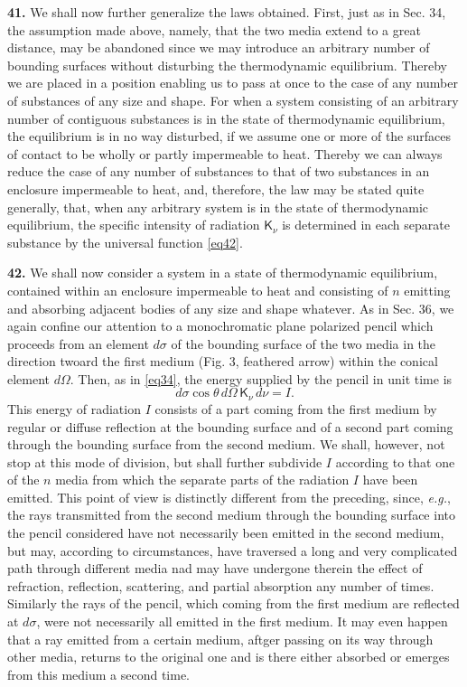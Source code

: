 \documentclass[12pt,oneside]{book}
\begin{document}
\textbf{41.} We shall now further generalize the laws obtained. First, just as in Sec. 34, the assumption made above, namely, that the two media extend to a great distance, may be abandoned since we may introduce an arbitrary number of bounding surfaces without disturbing the thermodynamic equilibrium. Thereby we are placed in a position enabling us to pass at once to the case of any number of substances of any size and shape. For when a system consisting of an arbitrary number of contiguous substances is in the state of thermodynamic equilibrium, the equilibrium is in no way disturbed, if we assume one or more of the surfaces of contact to be wholly or partly impermeable to heat. Thereby we can always reduce the case of any number of substances to that of two substances in an enclosure impermeable to heat, and, therefore, the law may be stated quite generally, that, when any arbitrary system is in the state of thermodynamic equilibrium, the specific intensity of radiation $\mathsf{K}_\nu$ is determined in each separate substance by the universal function \eqref{eq42}. \par

\textbf{42.} We shall now consider a system in a state of thermodynamic equilibrium, contained within an enclosure impermeable to heat and consisting of $n$ emitting and absorbing adjacent bodies of any size and shape whatever. As in Sec. 36, we again confine our attention to a monochromatic plane polarized pencil which proceeds from an element $d\sigma$ of the bounding surface of the two media in the direction twoard the first medium (Fig. 3, feathered arrow) within the conical element $d\Omega$. Then, as in \eqref{eq34}, the energy supplied by the pencil in unit time is
\begin{equation}
    d\sigma\cos\theta\,d\Omega\,\mathsf{K}_\nu\,d\nu=I.
    \label{eq43}
\end{equation}
This energy of radiation $I$ consists of a part coming from the first medium by regular or diffuse reflection at the bounding surface and of a second part coming through the bounding surface from the second medium. We shall, however, not stop at this mode of division, but shall further subdivide $I$ according to that one of the $n$ media from which the separate parts of the radiation $I$ have been emitted. This point of view is distinctly different from the preceding, since, \textit{e.g.}, the rays transmitted from the second medium through the bounding surface into the pencil considered have not necessarily been emitted in the second medium, but may, according to circumstances, have traversed a long and very complicated path through different media nad may have undergone therein the effect of refraction, reflection, scattering, and partial absorption any number of times. Similarly the rays of the pencil, which coming from the first medium are reflected at $d\sigma$, were not necessarily all emitted in the first medium. It may even happen that a ray emitted from a certain medium, aftger passing on its way through other media, returns to the original one and is there either absorbed or emerges from this medium a second time. \par
\end{document}
